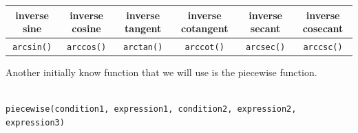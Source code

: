 \documentclass[]{book}
\theoremstyle{definition}
\theoremstyle{definition}
\theoremstyle{definition}
\theoremstyle{remark}
\begin{document}
\begin{longtable}[]{@{}cccccc@{}}
\toprule
\begin{minipage}[b]{0.13\columnwidth}\centering
inverse sine\strut
\end{minipage} & \begin{minipage}[b]{0.13\columnwidth}\centering
inverse cosine\strut
\end{minipage} & \begin{minipage}[b]{0.13\columnwidth}\centering
inverse tangent\strut
\end{minipage} & \begin{minipage}[b]{0.16\columnwidth}\centering
inverse cotangent\strut
\end{minipage} & \begin{minipage}[b]{0.13\columnwidth}\centering
inverse secant\strut
\end{minipage} & \begin{minipage}[b]{0.15\columnwidth}\centering
inverse cosecant\strut
\end{minipage}\tabularnewline
\midrule
\endhead
\begin{minipage}[t]{0.13\columnwidth}\centering
\texttt{arcsin()}\strut
\end{minipage} & \begin{minipage}[t]{0.13\columnwidth}\centering
\texttt{arccos()}\strut
\end{minipage} & \begin{minipage}[t]{0.13\columnwidth}\centering
\texttt{arctan()}\strut
\end{minipage} & \begin{minipage}[t]{0.16\columnwidth}\centering
\texttt{arccot()}\strut
\end{minipage} & \begin{minipage}[t]{0.13\columnwidth}\centering
\texttt{arcsec()}\strut
\end{minipage} & \begin{minipage}[t]{0.15\columnwidth}\centering
\texttt{arccsc()}\strut
\end{minipage}\tabularnewline
\bottomrule
\end{longtable}

Another initially know function that we will use is the piecewise function.

\begin{verbatim}

piecewise(condition1, expression1, condition2, expression2, expression3)
\end{verbatim}
\end{document}
